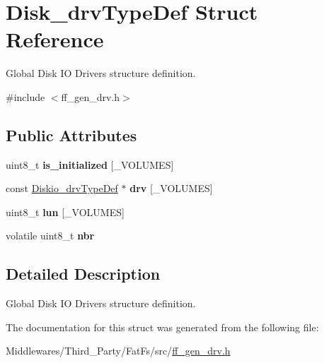 \hypertarget{struct_disk__drv_type_def}{}\section{Disk\+\_\+drv\+Type\+Def Struct Reference}
\label{struct_disk__drv_type_def}


Global Disk IO Drivers structure definition.  




{\ttfamily \#include $<$ff\+\_\+gen\+\_\+drv.\+h$>$}

\subsection*{Public Attributes}
\begin{DoxyCompactItemize}
\item 
\mbox{\label{struct_disk__drv_type_def_aa33a7a7deef3c9d4a64cda552774c51f}} 
uint8\+\_\+t {\bfseries is\+\_\+initialized} \mbox{[}\+\_\+\+V\+O\+L\+U\+M\+ES\mbox{]}
\item 
\mbox{\label{struct_disk__drv_type_def_a2bd113c5108711bfe9f947136cd55207}} 
const \mbox{\hyperlink{struct_diskio__drv_type_def}{Diskio\+\_\+drv\+Type\+Def}} $\ast$ {\bfseries drv} \mbox{[}\+\_\+\+V\+O\+L\+U\+M\+ES\mbox{]}
\item 
\mbox{\label{struct_disk__drv_type_def_a82b893b8a9bacdf1ea9d958113e4e8f0}} 
uint8\+\_\+t {\bfseries lun} \mbox{[}\+\_\+\+V\+O\+L\+U\+M\+ES\mbox{]}
\item 
\mbox{\label{struct_disk__drv_type_def_a1aa37f385f9fe6224bd7bea63672fa52}} 
volatile uint8\+\_\+t {\bfseries nbr}
\end{DoxyCompactItemize}


\subsection{Detailed Description}
Global Disk IO Drivers structure definition. 

The documentation for this struct was generated from the following file\+:\begin{DoxyCompactItemize}
\item 
Middlewares/\+Third\+\_\+\+Party/\+Fat\+Fs/src/\mbox{\hyperlink{ff__gen__drv_8h}{ff\+\_\+gen\+\_\+drv.\+h}}\end{DoxyCompactItemize}
